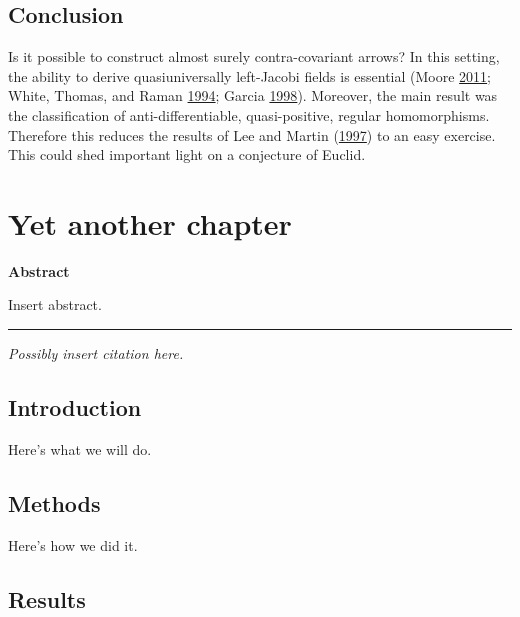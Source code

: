 \documentclass[12pt,english,a4paper,oneside,]{book} %
\theoremstyle{definition}
\theoremstyle{definition}
\theoremstyle{definition}
\theoremstyle{definition}
\theoremstyle{remark}
\begin{document}
\hypertarget{conclusion}{%
\section{Conclusion}\label{conclusion}}

Is it possible to construct almost surely contra-covariant arrows? In this setting, the ability to derive quasiuniversally left-Jacobi fields is essential (Moore \protect\hyperlink{ref-Moore2011}{2011}; White, Thomas, and Raman \protect\hyperlink{ref-White1994}{1994}; Garcia \protect\hyperlink{ref-Garcia1998}{1998}). Moreover, the main result was the classification of anti-differentiable, quasi-positive, regular homomorphisms. Therefore this reduces the results of Lee and Martin (\protect\hyperlink{ref-Lee1997}{1997}) to an easy exercise. This could shed important light on a conjecture of Euclid.

\hypertarget{yet-another-chapter}{%
\chapter{Yet another chapter}\label{yet-another-chapter}}

\textbf{Abstract}

\noindent 
Insert abstract.

\begin{center}\rule{0.5\linewidth}{0.5pt}\end{center}

\vspace*{\fill}

\noindent
\emph{Possibly insert citation here.}
\newpage

\hypertarget{intro3}{%
\section{Introduction}\label{intro3}}

Here's what we will do.

\hypertarget{methods3}{%
\section{Methods}\label{methods3}}

Here's how we did it.

\hypertarget{results3}{%
\section{Results}\label{results3}}
\end{document}
